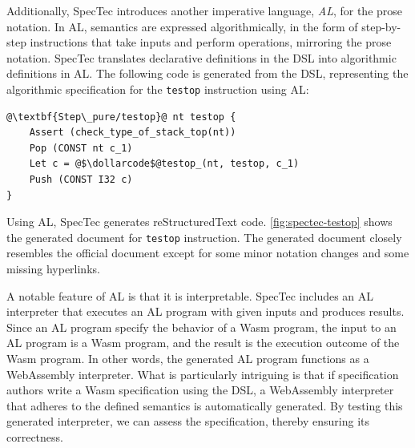 Additionally, SpecTec introduces another imperative language, \textit{AL}, for
the prose notation.
In AL, semantics are expressed algorithmically, in the form of step-by-step
instructions that take inputs and perform operations, mirroring the prose notation.
SpecTec translates declarative definitions in the DSL into algorithmic
definitions in AL.
The following code is generated from the DSL, representing the algorithmic
specification for the \texttt{testop} instruction using AL:
\begin{lstlisting}[style=al]
@\textbf{Step\_pure/testop}@ nt testop {
    Assert (check_type_of_stack_top(nt))
    Pop (CONST nt c_1)
    Let c = @$\dollarcode$@testop_(nt, testop, c_1)
    Push (CONST I32 c)
}
\end{lstlisting}
Using AL, SpecTec generates reStructuredText code.
\cref{fig:spectec-testop} shows the generated document for \texttt{testop}
instruction.
The generated document closely resembles the official document except for some
minor notation changes and some missing hyperlinks.


A notable feature of AL is that it is interpretable.
SpecTec includes an AL interpreter that executes an AL program with given inputs
and produces results.
Since an AL program specify the behavior of a Wasm program, the input to an AL
program is a Wasm program, and the result is the execution outcome of the Wasm
program.
In other words, the generated AL program functions as a WebAssembly interpreter.
What is particularly intriguing is that if specification authors write a Wasm
specification using the DSL, a WebAssembly interpreter that adheres to the
defined semantics is automatically generated.
By testing this generated interpreter, we can assess the specification,
thereby ensuring its correctness.
